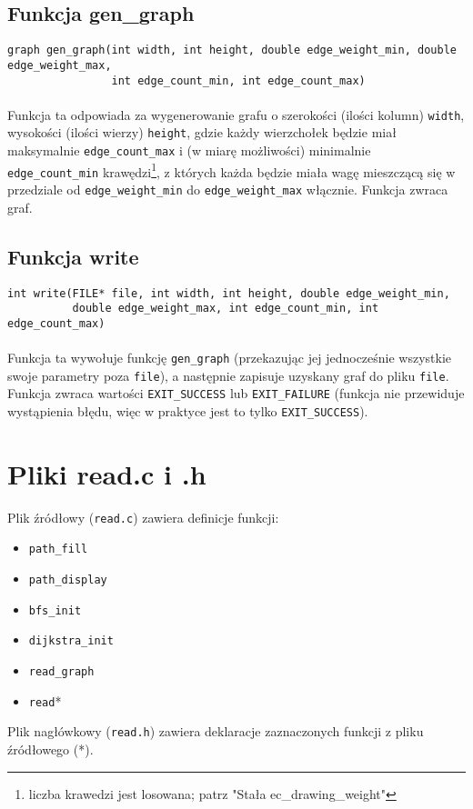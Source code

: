 \documentclass[11pt,a4paper]{report}
\begin{document}
    \subsection{Funkcja gen\_graph}
    \verb|graph gen_graph(int width, int height, double edge_weight_min, double edge_weight_max,|\\
    \verb|                int edge_count_min, int edge_count_max)|\\
    \\
    Funkcja ta odpowiada za wygenerowanie grafu o szerokości (ilości kolumn) \verb|width|, wysokości (ilości wierzy) \verb|height|, gdzie każdy wierzchołek będzie miał maksymalnie \verb|edge_count_max| i (w miarę możliwości) minimalnie \verb|edge_count_min| krawędzi\footnote{liczba krawedzi jest losowana; patrz "Stała ec\_drawing\_weight"}, z których każda będzie miała wagę mieszczącą się w przedziale od \verb|edge_weight_min| do \verb|edge_weight_max| włącznie. Funkcja zwraca graf.\\
    \subsection{Funkcja write}
    \verb|int write(FILE* file, int width, int height, double edge_weight_min,|\\
    \verb|          double edge_weight_max, int edge_count_min, int edge_count_max)|\\
    \\
    Funkcja ta wywołuje funkcję \verb|gen_graph| (przekazując jej jednocześnie wszystkie swoje parametry poza \verb|file|), a następnie zapisuje uzyskany graf do pliku \verb|file|. Funkcja zwraca wartości \verb|EXIT_SUCCESS| lub \verb|EXIT_FAILURE| (funkcja nie przewiduje wystąpienia błędu, więc w praktyce jest to tylko \verb|EXIT_SUCCESS|).

    \newpage
    \section{Pliki read.c i .h}
    Plik źródłowy (\verb|read.c|) zawiera definicje funkcji:
    \begin{itemize}
        \item \verb|path_fill|
        \item \verb|path_display|
        \item \verb|bfs_init|
        \item \verb|dijkstra_init|
        \item \verb|read_graph|
        \item \verb|read|*
    \end{itemize}
    Plik nagłówkowy (\verb|read.h|) zawiera deklaracje zaznaczonych funkcji z pliku źródłowego (*).\\
\end{document}
